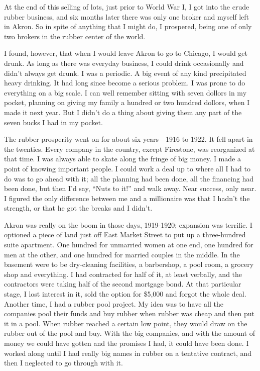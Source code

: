 \begin{biblechapter}
\verse At the end of this selling of lots, 
    just prior to World War I, 
    I got into the crude rubber business, 
    and six months later there was only one broker and myself left in Akron.
\verse So in spite of anything that I might do, 
    I prospered, 
    being one of only two brokers in the rubber center of the world.

\verse I found, however, 
    that when I would leave Akron to go to Chicago, 
    I would get drunk.
\verse As long as there was everyday business, 
    I could drink occasionally 
    and didn’t always get drunk.
\verse I was a periodic.
\verse A big event of any kind precipitated heavy drinking.
\verse It had long since become a serious problem.
\verse I was prone to do everything on a big scale.
\verse I can well remember sitting with seven dollors in my pocket, 
    planning on giving my family a hundred or two hundred dollors, 
    when I made it next year. 
\verse But I didn’t do a thing about giving them any part 
    of the seven bucks I had in my pocket.

\verse The rubber prosperity went on for about six years—1916 to 1922.
\verse It fell apart in the twenties.
\verse Every company in the country, 
    except Firestone, was reorganized at that time.
\verse I was always able to skate along the fringe of big money.
\verse I made a point of knowing important people.
\verse I could work a deal up to where all I had to do 
    was to go ahead with it; 
    all the planning had been done, 
    all the financing had been done, 
    but then I’d say, 
    “Nuts to it!” 
    and walk away.
\verse Near success, only near.
\verse I figured the only difference between me and a millionaire 
    was that I hadn’t the strength, 
    or that he got the breaks and I didn’t.

\verse Akron was really on the boom in those days, 1919-1920; 
    expansion was terrific. 
\verse I optioned a piece of land just off East Market Street 
    to put up a three-hundred suite apartment. 
\verse One hundred for unmarried women at one end, 
    one hundred for men at the other, 
    and one hundred for married couples in the middle.
\verse In the basement were to be dry-cleaning facilities, 
    a barbershop, 
    a pool room, 
    a grocery shop and everything. 
\verse I had contracted for half of it, at least verbally, 
    and the contractors were taking half of the second mortgage bond.
\verse At that particular stage, 
    I lost interest in it, 
    sold the option for \$5,000 
    and forgot the whole deal.
\verse Another time, I had a rubber pool project.
\verse My idea was to have all the companies pool their funds 
    and buy rubber when rubber was cheap 
    and then put it in a pool.
\verse When rubber reached a certain low point, 
    they would draw on the rubber out of the pool and buy.
\verse With the big companies, 
    and with the amount of money we could have gotten 
    and the promises I had, 
    it could have been done.
\verse I worked along until I had really big names in rubber 
    on a tentative contract, 
    and then I neglected to go through with it.


\end{biblechapter}

